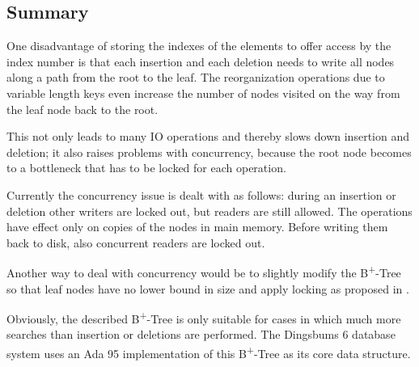 \documentclass[a4paper, 8pt]{scrartcl}
\theoremstyle{plain}
\theoremstyle{definition}
\theoremstyle{remark}
\newcommand \BTree { B\textsuperscript{+}-Tree }
\begin{document}
\begin{multicols}{2}
\section{Summary}

One disadvantage of storing the indexes of the elements to offer access by
the index number is that each insertion and each deletion needs to write
all nodes along a path from the root to the leaf.
The reorganization operations due to variable length keys even increase the 
number of nodes visited on the way from the leaf node back to the root.

This not only leads to many IO operations and thereby slows down insertion and
deletion; it also raises problems with concurrency, because the root node
becomes to a bottleneck that has to be locked for each operation.

Currently the concurrency issue is dealt with as follows: during an insertion or
deletion other writers are locked out, but readers are still allowed. The
operations have effect only on copies of the nodes in main memory. Before 
writing them back to disk, also concurrent readers are locked out.

Another way to deal with concurrency would be to slightly modify the \BTree so
that leaf nodes have no lower bound in size and apply locking as proposed in
\cite{Lehman}.

Obviously, the described \BTree is only suitable for cases in which much more
searches than insertion or deletions are performed.
The Dingsbums 6 database system uses an Ada 95 implementation of this
\BTree as its core data structure.


\end{multicols}
\end{document}
